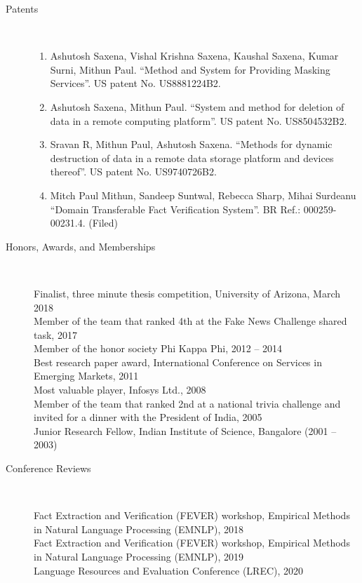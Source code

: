 \documentclass[10pt]{article}
\newcommand{\ti}[1]{``#1''} %
\begin{document}
\begin{description}
\item [Patents] \
\begin{enumerate}


\item 
Ashutosh Saxena, Vishal Krishna Saxena, Kaushal Saxena, Kumar Surni, Mithun Paul. \ti{Method and System for Providing Masking Services}.  US patent No. US8881224B2.
\item 
Ashutosh Saxena, Mithun Paul. \ti{System and method for deletion of data in a remote computing platform}.  US patent No. US8504532B2.
\item 
Sravan R, Mithun Paul, Ashutosh Saxena. \ti{Methods for dynamic destruction of data in a remote data storage platform and devices thereof}.  US patent No. US9740726B2.

\item 
Mitch Paul Mithun, Sandeep Suntwal, Rebecca Sharp, Mihai Surdeanu \ti{Domain Transferable Fact Verification System}.  BR Ref.: 000259-00231.4. (Filed)\\

\end{enumerate}

\vspace{-.3cm}
\item [Honors, Awards, and Memberships]\

Finalist, three minute thesis competition, University of Arizona, March 2018\\
Member of the team that ranked 4th at the Fake News Challenge shared task, 2017\\
Member of the honor society Phi Kappa Phi, 2012 -- 2014\\
Best research paper award, International Conference on Services in Emerging Markets, 2011\\
Most valuable player,  Infosys  Ltd., 2008\\
Member of the team that ranked 2nd at a national trivia challenge and invited for a dinner with the President of India, 2005\\
Junior Research Fellow, Indian Institute of Science, Bangalore (2001 – 2003)\\




\vspace{-.4cm}\item [Conference Reviews]\ 

Fact Extraction and Verification (FEVER) workshop, Empirical Methods in Natural Language Processing (EMNLP), 2018\\
Fact Extraction and Verification (FEVER) workshop, Empirical Methods in Natural Language Processing (EMNLP), 2019\\
Language Resources and Evaluation Conference (LREC), 2020\\






\end{description}
\end{document}
